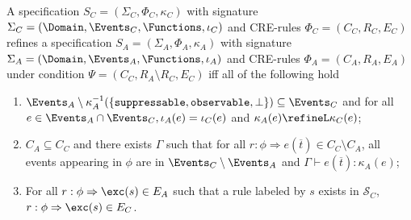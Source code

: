 \begin{definition}
    \label{def:lex-refinement}
    A specification
    $S_C = \left( \Sigma_C, \Phi_C, \kappa_C \right)$
    with signature $\Sigma_C = \left( \Domain, \Events_C, \Functions, \iota_C \right)$
    and CRE-rules $\Phi_C = \left(C_C, R_C, E_C \right)$
    refines a specification
    $S_A = \left( \Sigma_A, \Phi_A, \kappa_A \right)$
    with signature $\Sigma_A = \left( \Domain, \Events_A, \Functions, \iota_A \right)$
    and CRE-rules $\Phi_A = \left(C_A, R_A, E_A \right)$
    under condition $\Psi = \left(C_C, R_A \setminus R_C, E_C \right)$
    iff all of the following hold
    \begin{enumerate}
        \item 
        $\Events_A \setminus \kappa_A^{-1} 
        (\lbrace\texttt{suppressable},\texttt{observable},\bot\rbrace)
        \subseteq \Events_C$
        and
        for all
        $e \in \Events_A \cap \Events_C,
        \iota_A(e) = \iota_C(e)$
        and
        $\kappa_A(e) \refineL \kappa_C(e)$;
        \item
        $C_A \subseteq C_C$ and
        there exists
        $\Gamma$ such that for all $r:\phi \Rightarrow e(\overline{t}) \in C_C \setminus C_A$,
        all events appearing in $\phi$ are in
        $\Events_C \setminus \Events_A$
        and
        $\Gamma \vdash e(\overline{t}) : \kappa_A(e)$;
        \item
        For all $r: \phi \Rightarrow \exc(s) \in E_A$ such that
        a rule labeled by $s$ exists in
        $\mathcal{S}_C$, $r: \phi \Rightarrow \exc(s) \in E_C$.
    \end{enumerate}


\end{definition}
